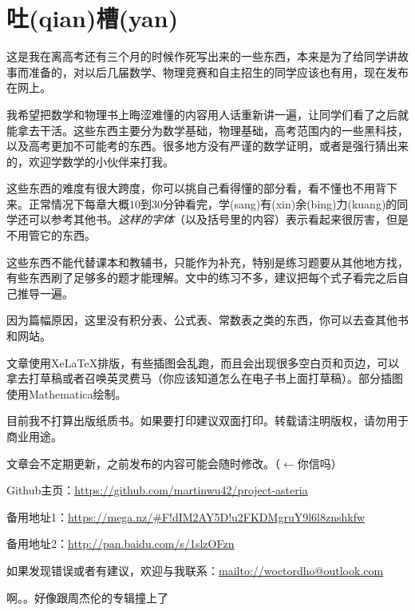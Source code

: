 \chapter{吐(qian)槽(yan)}
这是我在离高考还有三个月的时候作死写出来的一些东西，本来是为了给同学讲故事而准备的，对以后几届数学、物理竞赛和自主招生的同学应该也有用，现在发布在网上。

我希望把数学和物理书上晦涩难懂的内容用人话重新讲一遍，让同学们看了之后就能拿去干活。这些东西主要分为数学基础，物理基础，高考范围内的一些黑科技，以及高考更加不可能考的东西。很多地方没有严谨的数学证明，或者是强行猜出来的，欢迎学数学的小伙伴来打我。

这些东西的难度有很大跨度，你可以挑自己看得懂的部分看，看不懂也不用背下来。正常情况下每章大概$10$到$30$分钟看完，学(sang)有(xin)余(bing)力(kuang)的同学还可以参考其他书。\emph{这样的字体}（以及括号里的内容）表示看起来很厉害，但是不用管它的东西。

这些东西不能代替课本和教辅书，只能作为补充，特别是练习题要从其他地方找，有些东西刷了足够多的题才能理解。文中的练习不多，建议把每个式子看完之后自己推导一遍。

因为篇幅原因，这里没有积分表、公式表、常数表之类的东西，你可以去查其他书和网站。

文章使用XeLaTeX排版，有些插图会乱跑，而且会出现很多空白页和页边，可以拿去打草稿或者召唤英灵费马（你应该知道怎么在电子书上面打草稿）。部分插图使用Mathematica绘制。

目前我不打算出版纸质书。如果要打印建议双面打印。转载请注明版权，请勿用于商业用途。

文章会不定期更新，之前发布的内容可能会随时修改。（$\leftarrow$你信吗）

Github主页：\url{https://github.com/martinwu42/project-asteria}

备用地址1：\url{https://mega.nz/#F!dIM2AY5D!u2FKDMgruY9l6l8znshkfw}

备用地址2：\url{http://pan.baidu.com/s/1slzOFzn}

如果发现错误或者有建议，欢迎与我联系：\url{mailto://woctordho@outlook.com}

啊。。好像跟周杰伦的专辑撞上了
